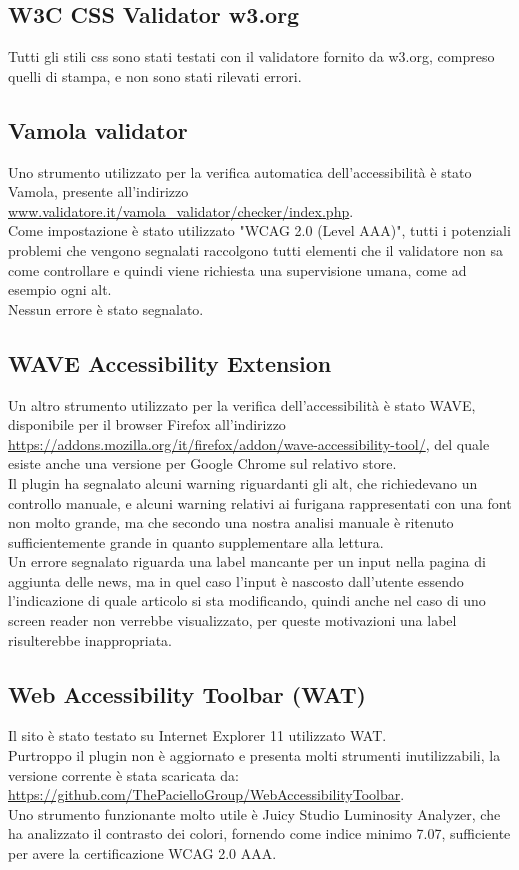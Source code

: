 \documentclass[openany, a4paper, 12pt]{report}
\begin{document}
			\subsection{W3C CSS Validator w3.org}
				Tutti gli stili css sono stati testati con il validatore fornito da w3.org, compreso quelli di stampa, e non sono stati rilevati errori.
				
			\subsection{Vamola validator}
				Uno strumento utilizzato per la verifica automatica dell'accessibilità è stato Vamola, presente all'indirizzo \url{www.validatore.it/vamola_validator/checker/index.php}.\\
				Come impostazione è stato utilizzato "WCAG 2.0 (Level AAA)", tutti i potenziali problemi che vengono segnalati raccolgono tutti elementi che il validatore non sa come controllare e quindi viene richiesta una supervisione umana, come ad esempio ogni alt.\\
				Nessun errore è stato segnalato.
			\subsection{WAVE Accessibility Extension}
				Un altro strumento utilizzato per la verifica dell'accessibilità è stato WAVE, disponibile per il browser Firefox all'indirizzo \url{https://addons.mozilla.org/it/firefox/addon/wave-accessibility-tool/}, del quale esiste anche una versione per Google Chrome sul relativo store.\\
				Il plugin ha segnalato alcuni warning riguardanti gli alt, che richiedevano un controllo manuale, e alcuni warning relativi ai furigana rappresentati con una font non molto grande, ma che secondo una nostra analisi manuale è ritenuto sufficientemente grande in quanto supplementare alla lettura.\\
				Un errore segnalato riguarda una label mancante per un input nella pagina di aggiunta delle news, ma in quel caso l'input è nascosto dall'utente essendo l'indicazione di quale articolo si sta modificando, quindi anche nel caso di uno screen reader non verrebbe visualizzato, per queste motivazioni una label risulterebbe inappropriata.
			\subsection{Web Accessibility Toolbar (WAT)}
				Il sito è stato testato su Internet Explorer 11 utilizzato WAT.\\
				Purtroppo il plugin non è aggiornato e presenta molti strumenti inutilizzabili, la versione corrente è stata scaricata da:\\ \url{https://github.com/ThePacielloGroup/WebAccessibilityToolbar}.\\
				Uno strumento funzionante molto utile è Juicy Studio Luminosity Analyzer, che ha analizzato il contrasto dei colori, fornendo come indice minimo 7.07, sufficiente per avere la certificazione WCAG 2.0 AAA.\\
\end{document}
